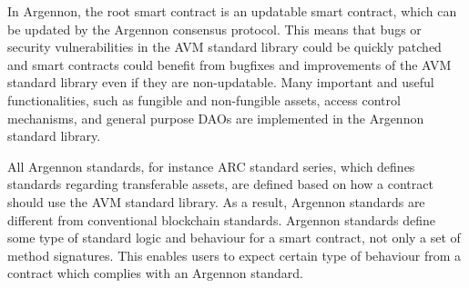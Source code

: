 In Argennon, the root smart contract is an updatable smart contract, which can be updated by the Argennon consensus
protocol. This means that bugs or security vulnerabilities in the AVM standard library could be quickly patched and
smart contracts could benefit from bugfixes and improvements of the AVM standard library even if they are
non-updatable. Many important and useful functionalities,
such as fungible and non-fungible assets, access control mechanisms,
and general purpose DAOs are implemented in the Argennon standard library.

All Argennon standards, for instance ARC standard series, which defines standards regarding transferable assets,
are defined based on how a contract should use the AVM standard library. As a result, Argennon standards are
different from conventional blockchain standards. Argennon standards define some type of standard logic and
behaviour for a smart contract, not only a set of method signatures. This enables users to expect certain type
of behaviour from a contract which complies with an Argennon standard.
